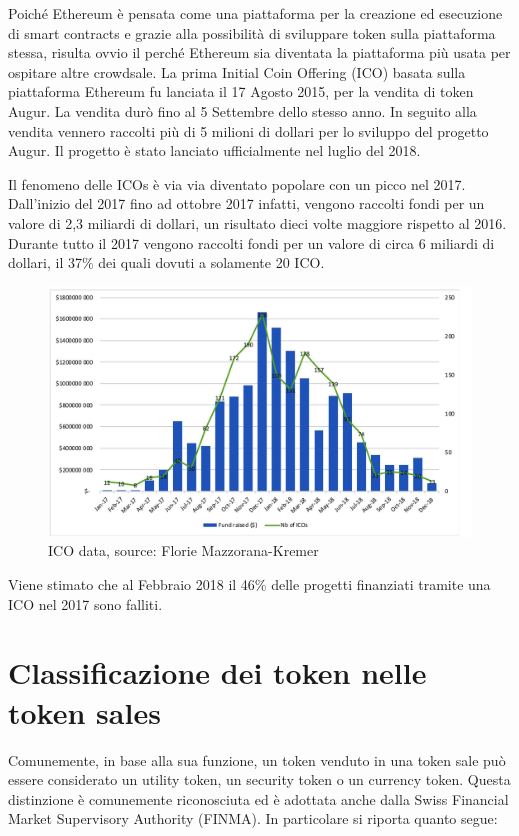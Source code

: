 Poiché Ethereum è pensata come una piattaforma per la creazione ed esecuzione di smart contracts e grazie alla possibilità di sviluppare token sulla piattaforma stessa, risulta ovvio il perché Ethereum sia diventata la piattaforma più usata per ospitare altre crowdsale. La prima Initial Coin Offering (ICO) basata sulla piattaforma Ethereum fu lanciata il 17 Agosto 2015, per la vendita di token Augur\cite{K29}. La vendita durò fino al 5 Settembre dello stesso anno. In seguito alla vendita vennero raccolti più di 5 milioni di dollari per lo sviluppo del progetto Augur. Il progetto è stato lanciato ufficialmente nel luglio del 2018. 

Il fenomeno delle ICOs è via via diventato popolare con un picco nel 2017. Dall'inizio  del 2017 fino ad ottobre 2017 infatti, vengono raccolti fondi per un valore di 2,3 miliardi di dollari, un risultato dieci volte maggiore rispetto al 2016. 
Durante tutto il 2017 vengono raccolti fondi per un valore di circa 6 miliardi di dollari, il 37\% dei quali dovuti a solamente 20 ICO. 

\begin{figure}[H]
  \includegraphics[width=\linewidth]{ico.jpg}
  \caption{ICO data, source: Florie Mazzorana-Kremer\cite{K30}}
  \label{fig:ico}
\end{figure}

Viene stimato che al Febbraio 2018 il 46\% delle progetti finanziati tramite una ICO nel 2017 sono falliti. 

\section{Classificazione dei token nelle token sales}
Comunemente, in base alla sua funzione, un token venduto in una token sale può essere considerato un utility token, un security token o un currency token. Questa distinzione è comunemente riconosciuta ed è adottata anche dalla Swiss Financial Market Supervisory Authority (FINMA). In particolare si riporta quanto segue:

